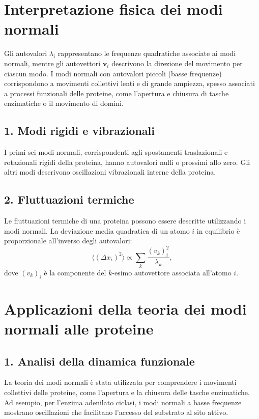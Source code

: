 \documentclass[Lau,binding=0.6cm,oneside,noexaminfo]{sapthesis}
\begin{document}
\section{Interpretazione fisica dei modi normali}

Gli autovalori $\lambda_i$ rappresentano le frequenze quadratiche associate ai modi normali, mentre gli autovettori $\mathbf{v}_i$ descrivono la direzione del movimento per ciascun modo. I modi normali con autovalori piccoli (basse frequenze) corrispondono a movimenti collettivi lenti e di grande ampiezza, spesso associati a processi funzionali delle proteine, come l'apertura e chiusura di tasche enzimatiche o il movimento di domini.

\subsection*{1. Modi rigidi e vibrazionali}
I primi sei modi normali, corrispondenti agli spostamenti traslazionali e rotazionali rigidi della proteina, hanno autovalori nulli o prossimi allo zero. Gli altri modi descrivono oscillazioni vibrazionali interne della proteina.

\subsection*{2. Fluttuazioni termiche}
Le fluttuazioni termiche di una proteina possono essere descritte utilizzando i modi normali. La deviazione media quadratica di un atomo $i$ in equilibrio è proporzionale all'inverso degli autovalori:
\[
\langle (\Delta x_i)^2 \rangle \propto \sum_{k} \frac{(v_k)_i^2}{\lambda_k},
\]
dove $(v_k)_i$ è la componente del $k$-esimo autovettore associata all’atomo $i$.

\section{Applicazioni della teoria dei modi normali alle proteine}

\subsection*{1. Analisi della dinamica funzionale}
La teoria dei modi normali è stata utilizzata per comprendere i movimenti collettivi delle proteine, come l’apertura e la chiusura delle tasche enzimatiche. Ad esempio, per l'enzima adenilato ciclasi, i modi normali a basse frequenze mostrano oscillazioni che facilitano l'accesso del substrato al sito attivo.
\end{document}
